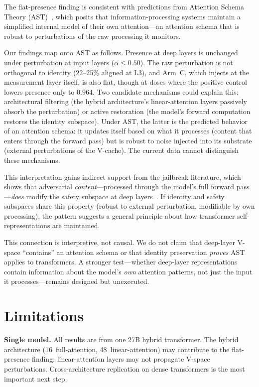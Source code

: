 \documentclass[11pt,a4paper]{article}
\begin{document}
The flat-presence finding is consistent with predictions from
Attention Schema Theory
(AST)~\citep{graziano2015attention,graziano2017attention}, which posits that
information-processing systems maintain a simplified internal model of their
own attention---an attention schema that is robust to perturbations of the
raw processing it monitors.

Our findings map onto AST as follows. Presence at deep layers is
unchanged under perturbation at input layers ($\alpha \le 0.50$). The raw
perturbation is not orthogonal to identity (22--25\% aligned at L3), and
Arm~C, which injects at the measurement layer itself, is also flat,
though at doses where the positive control lowers presence only to
$0.964$. Two candidate mechanisms could explain this:
architectural filtering (the hybrid architecture's linear-attention layers
passively absorb the perturbation) or active restoration (the model's
forward computation restores the identity subspace). Under AST, the latter
is the predicted behavior of an attention schema: it updates itself based
on what it processes (content that enters through the forward pass) but is
robust to noise injected into its substrate (external perturbations of the
V-cache). The current data cannot distinguish these mechanisms.

This interpretation gains indirect support from the jailbreak literature,
which shows that adversarial \emph{content}---processed through the model's
full forward pass---\emph{does} modify the safety subspace at deep
layers~\citep{arditi2024refusal}. If identity and safety subspaces share
this property (robust to external perturbation, modifiable by own
processing), the pattern suggests a general principle about how transformer
self-representations are maintained.

This connection is interpretive, not causal. We do not claim that deep-layer
V-space ``contains'' an attention schema or that identity preservation
\emph{proves} AST applies to transformers. A stronger test---whether
deep-layer representations contain information about the model's \emph{own}
attention patterns, not just the input it processes---remains designed but
unexecuted.

\section{Limitations}
\label{sec:limitations}

\textbf{Single model.} All results are from one 27B hybrid transformer.
The hybrid architecture (16~full-attention, 48~linear-attention) may
contribute to the flat-presence finding: linear-attention layers
may not propagate V-space perturbations. Cross-architecture replication on
dense transformers is the most important next step.
\end{document}
